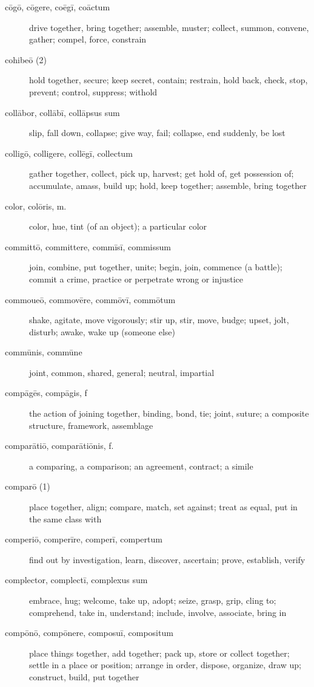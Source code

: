 \begin{description}
    \item[cōgō, cōgere, coēgī, coāctum] \marginnote{*}drive together, bring together; assemble, muster; collect, summon, convene, gather; compel, force, constrain
    \item[cohibeō (2)] hold together, secure; keep secret, contain; restrain, hold back, check, stop, prevent; control, suppress; withold
    \item[collābor, collābī, collāpsus sum] slip, fall down, collapse; give way, fail; collapse, end suddenly, be lost
    \item[colligō, colligere, collēgī, collectum] \marginnote{*}gather together, collect, pick up, harvest; get hold of, get possession of; accumulate, amass, build up; hold, keep together; assemble, bring together
    \item[color, colōris, m.] \marginnote{*}color, hue, tint (of an object); a particular color
    \item[committō, committere, commīsī, commissum] join, combine, put together, unite; begin, join, commence (a battle); commit a crime, practice or perpetrate wrong or injustice
    \item[commoueō, commovēre, commōvī, commōtum] shake, agitate, move vigorously; stir up, stir, move, budge; upset, jolt, disturb; awake, wake up (someone else)
    \item[commūnis, commūne] \marginnote{*}joint, common, shared, general; neutral, impartial
    \item[compāgēs, compāgis, f] the action of joining together, binding, bond, tie; joint, suture; a composite structure, framework, assemblage
    \item[comparātiō, comparātiōnis, f.] a comparing, a comparison; an agreement, contract; a simile
    \item[comparō (1)] \marginnote{*}place together, align; compare, match, set against; treat as equal, put in the same class with
    \item[comperiō, comperīre, comperī, compertum] find out by investigation, learn, discover, ascertain; prove, establish, verify
    \item[complector, complectī, complexus sum] embrace, hug; welcome, take up, adopt; seize, grasp, grip, cling to; comprehend, take in, understand; include, involve, associate, bring in
    \item[compōnō, compōnere, composuī, compositum] \marginnote{*}place things together, add together; pack up, store or collect together; settle in a place or position; arrange in order, dispose, organize, draw up; construct, build, put together

\end{description}
